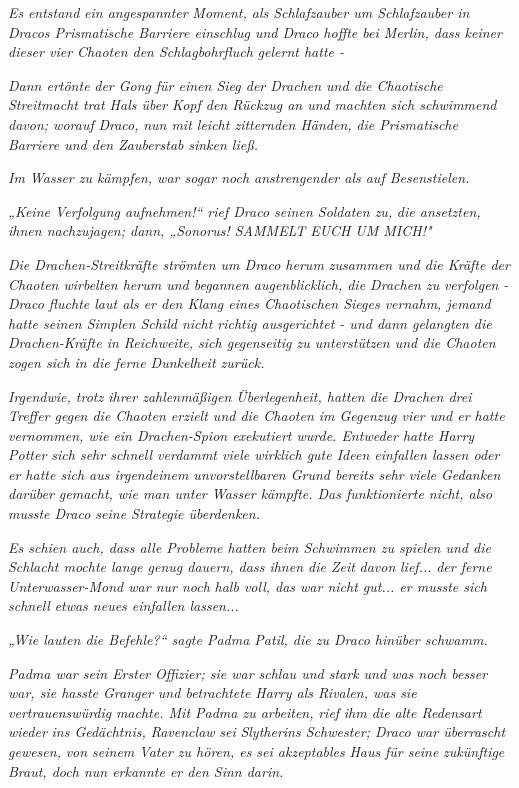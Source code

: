 {\emph{Es} \emph{entstand} \emph{ein angespannter} \emph{Moment, als Schlafzauber um Schlafzauber in Dracos Prismatische Barriere einschlug und Draco hoffte bei Merlin, dass keiner dieser vier Chaoten den Schlagbohrfluch} \emph{gelernt hatte -}

\emph{Dann ertönte} \emph{der Gong} \emph{für einen Sieg der Drachen und die Chaotische Streitmacht trat Hals über Kopf den Rückzug an und} \emph{machten sich schwimmend davon; worauf} \emph{Draco,} \emph{nun mit leicht zitternden Händen,} \emph{die Prismatische Barriere und den Zauberstab} \emph{sinken ließ.}

\emph{Im Wasser zu kämpfen, war sogar noch anstrengender als auf Besenstielen.}

\emph{„\emph{Keine Verfolgung aufnehmen!}“ rief Draco seinen Soldaten zu,} \emph{die ansetzten, ihnen nachzujagen; dann, „\emph{Sonorus! SAMMELT EUCH UM MICH!}"}

\emph{Die Drachen-Streitkräfte strömten um Draco herum zusammen und die Kräfte der Chaoten wirbelten herum und begannen augenblicklich, die Drachen zu} \emph{\emph{verfolgen}} \emph{- Draco fluchte laut als er den Klang eines Chaotischen Sieges vernahm, jemand hatte seinen Simplen Schild nicht richtig ausgerichtet - und dann gelangten die Drachen-Kräfte in Reichweite, sich gegenseitig zu unterstützen und die Chaoten zogen sich in die ferne Dunkelheit zurück.}

\emph{Irgendwie, trotz ihrer zahlenmäßigen Überlegenheit, hatten die Drachen drei Treffer gegen die Chaoten erzielt und die Chaoten im Gegenzug vier und er hatte vernommen, wie ein Drachen-Spion exekutiert wurde. Entweder hatte Harry Potter sich sehr schnell verdammt viele wirklich gute Ideen einfallen lassen oder er hatte sich aus irgendeinem unvorstellbaren Grund bereits sehr viele Gedanken darüber gemacht, wie man unter Wasser kämpfte. Das funktionierte nicht, also musste Draco seine Strategie überdenken.}

\emph{Es schien auch, dass alle Probleme hatten beim Schwimmen zu spielen und die Schlacht mochte lange genug dauern, dass ihnen die Zeit} \emph{davon} \emph{lief...} \emph{der ferne Unterwasser-Mond war nur noch} \emph{halb voll, das war nicht gut... er musste sich} \emph{\emph{schnell}} \emph{etwas neues einfallen lassen...}

\emph{„Wie lauten die Befehle?“ sagte Padma Patil, die zu Draco hinüber schwamm.}

\emph{Padma war sein Erster} \emph{Offizier; sie war schlau und stark und was noch besser war, sie hasste Granger und betrachtete Harry als Rivalen, was sie} \emph{\emph{vertrauenswürdig}} \emph{machte. Mit Padma zu arbeiten,} \emph{rief} \emph{ihm die alte Redensart} \emph{wieder} \emph{ins Gedächtnis, Ravenclaw} \emph{sei} \emph{Slytherins Schwester; Draco war überrascht gewesen,} \emph{von seinem Vater zu hören, es sei akzeptables} \emph{Haus} \emph{für seine} \emph{zukünftige Braut, doch nun erkannte er den Sinn darin.}

}
